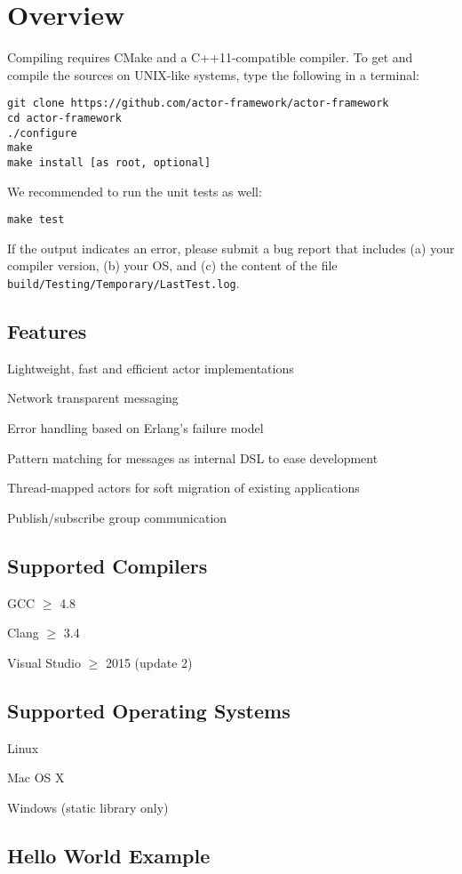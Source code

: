 \section{Overview}

Compiling \lib requires CMake and a C++11-compatible compiler. To get and compile the sources on UNIX-like systems, type the following in a terminal:

\begin{verbatim}
git clone https://github.com/actor-framework/actor-framework
cd actor-framework
./configure
make
make install [as root, optional]
\end{verbatim}

We recommended to run the unit tests as well:

\begin{verbatim}
make test
\end{verbatim}

If the output indicates an error, please submit a bug report that includes (a) your compiler version, (b) your OS, and (c) the content of the file \texttt{build/Testing/Temporary/LastTest.log}.

\subsection{Features}

\begin{itemize*}
  \item Lightweight, fast and efficient actor implementations
  \item Network transparent messaging
  \item Error handling based on Erlang's failure model
  \item Pattern matching for messages as internal DSL to ease development
  \item Thread-mapped actors for soft migration of existing applications
  \item Publish/subscribe group communication
\end{itemize*}


\subsection{Supported Compilers}

\begin{itemize*}
  \item GCC $\ge$ 4.8
  \item Clang $\ge$ 3.4
  \item Visual Studio $\ge$ 2015 (update 2)
\end{itemize*}

\subsection{Supported Operating Systems}

\begin{itemize*}
\item Linux
\item Mac OS X
\item Windows (static library only)
\end{itemize*}

\clearpage
\subsection{Hello World Example}


